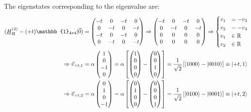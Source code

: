 \documentclass{article}
\newcommand{\lreck}[1]{\left[#1\right]}
\begin{document}
{	The eigenstates corresponding to the eigenvalue  are:
		\begin{align*}
			(\underline{H}_\text{H}^{(2)} - (+t)\mathbb{1}_{4x4} | \vec{0}) &=
			\begin{pmatrix}
				-t & 0 & -t & 0 \\
				0 & -t & 0 & -t \\
				-t & 0 & -t & 0 \\
				0 & -t & 0 & -t
			\end{pmatrix}
			\Rightarrow
			\begin{pmatrix}
				-t & 0 & -t & 0 \\
				0 & -t & 0 & -t \\
				0 & 0 & 0 & 0 \\
				0 & 0 & 0 & 0
			\end{pmatrix}
			\Rightarrow
			\begin{cases}
				v_1 &= -v_3 \\
				v_2 &= -v_4 \\
				v_1 &\in \mathbb{R} \\
				v_2 &\in \mathbb{R}
			\end{cases} \\
			\Rightarrow \vec{v}_{+t,1} &= \alpha
			\begin{pmatrix}
				1\\0\\-1\\0
			\end{pmatrix}
			=
			\alpha
			\lreck{
			\begin{pmatrix}
				1\\0\\0\\0
			\end{pmatrix}
			-
			\begin{pmatrix}
				0\\0\\1\\0
			\end{pmatrix}
			}
			=
			\frac{1}{\sqrt{2}}
			\lreck{ \ket{1000} - \ket{0010} } \equiv \ket{+t,1} \\
			\Rightarrow \vec{v}_{+t,2} &= \alpha
			\begin{pmatrix}
				0\\1\\0\\-1
			\end{pmatrix}
			=
			\alpha
			\lreck{
			\begin{pmatrix}
				0\\1\\0\\0
			\end{pmatrix}
			-
			\begin{pmatrix}
				0\\0\\0\\1
			\end{pmatrix}
			}
			=
			\frac{1}{\sqrt{2}}
			\lreck{ \ket{0100} - \ket{0001} } \equiv \ket{+t,2}
		\end{align*}
	
}
\end{document}
